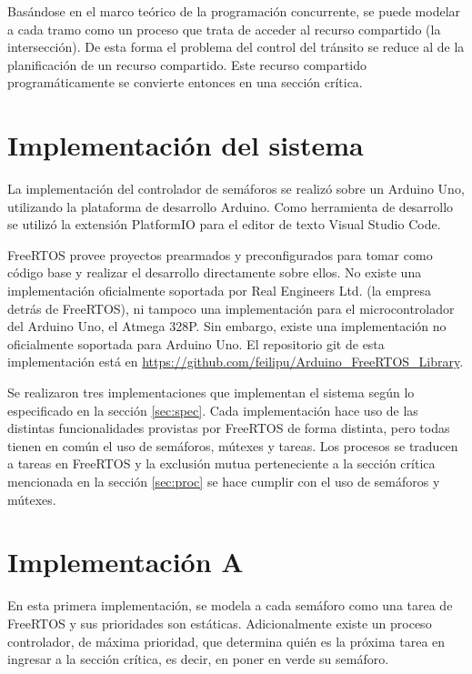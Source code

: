 		Basándose en el marco teórico de la programación concurrente, se puede modelar a cada tramo como un proceso que trata de acceder al recurso compartido (la intersección).
		De esta forma el problema del control del tránsito se reduce al de la planificación de un recurso compartido.
		Este recurso compartido programáticamente se convierte entonces en una sección crítica.



\section{Implementación del sistema}

	La implementación del controlador de semáforos se realizó sobre un Arduino Uno, utilizando la plataforma de desarrollo Arduino.
	Como herramienta de desarrollo se utilizó la extensión PlatformIO para el editor de texto Visual Studio Code.

	FreeRTOS provee proyectos prearmados y preconfigurados para tomar como código base y realizar el desarrollo directamente sobre ellos.
	No existe una implementación oficialmente soportada por Real Engineers Ltd. (la empresa detrás de FreeRTOS), ni tampoco una implementación para el microcontrolador del Arduino Uno, el Atmega 328P.
	Sin embargo, existe una implementación no oficialmente soportada para Arduino Uno.
	El repositorio git de esta implementación está en \url{https://github.com/feilipu/Arduino\_FreeRTOS\_Library}.

	Se realizaron tres implementaciones que implementan el sistema según lo especificado en la sección \ref{sec:spec}.
	Cada implementación hace uso de las distintas funcionalidades provistas por FreeRTOS de forma distinta, pero todas tienen en común el uso de semáforos, mútexes y tareas.
	Los procesos se traducen a tareas en FreeRTOS y la exclusión mutua perteneciente a la sección crítica mencionada en la sección \ref{sec:proc} se hace cumplir con el uso de semáforos y mútexes.



\section{Implementación A}

	En esta primera implementación, se modela a cada semáforo como una tarea de FreeRTOS y sus prioridades son estáticas.
	Adicionalmente existe un proceso controlador, de máxima prioridad, que determina quién es la próxima tarea en ingresar a la sección crítica, es decir, en poner en verde su semáforo.

